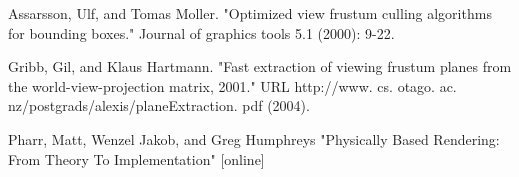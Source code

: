 \documentclass[report,11pt]{elsarticle}
\begin{document}

%
%
%

\label{SEC:References}
\renewcommand\bibname{References}
\begin{thebibliography}{10}

Assarsson, Ulf, and Tomas Moller.
\newblock "Optimized view frustum culling algorithms for bounding boxes." Journal of graphics tools 5.1 (2000): 9-22.

Gribb, Gil, and Klaus Hartmann.
\newblock "Fast extraction of viewing frustum planes from the world-view-projection matrix, 2001." URL http://www. cs. otago. ac. nz/postgrads/alexis/planeExtraction. pdf (2004).

Pharr, Matt, Wenzel Jakob, and Greg Humphreys
\newblock "Physically Based Rendering: From Theory To Implementation" [online]

\end{thebibliography}
\end{document}
